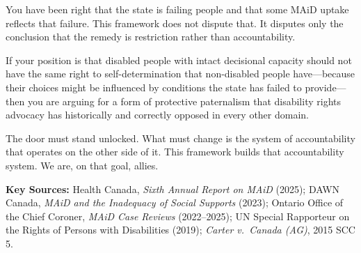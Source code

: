 \documentclass[11pt, letterpaper]{article}
\begin{document}
\begin{policybox}[title={\sffamily\bfseries\small\color{C@accent}
  A Direct Statement to Disability Rights Organizations}]
You have been right that the state is failing people and that some MAiD uptake reflects
that failure. This framework does not dispute that. It disputes only the conclusion that
the remedy is restriction rather than accountability.

If your position is that disabled people with intact decisional capacity should not have
the same right to self-determination that non-disabled people have---because their choices
might be influenced by conditions the state has failed to provide---then you are arguing
for a form of protective paternalism that disability rights advocacy has historically and
correctly opposed in every other domain.

The door must stand unlocked. What must change is the system of accountability that operates
on the other side of it. This framework builds that accountability system. We are, on that
goal, allies.
\end{policybox}

\bigskip

{\small\sffamily\color{C@midgray}
\textbf{Key Sources:}
Health Canada, \textit{Sixth Annual Report on MAiD} (2025);
DAWN Canada, \textit{MAiD and the Inadequacy of Social Supports} (2023);
Ontario Office of the Chief Coroner, \textit{MAiD Case Reviews} (2022--2025);
UN Special Rapporteur on the Rights of Persons with Disabilities (2019);
\textit{Carter v.\ Canada (AG)}, 2015 SCC 5.}
\end{document}
